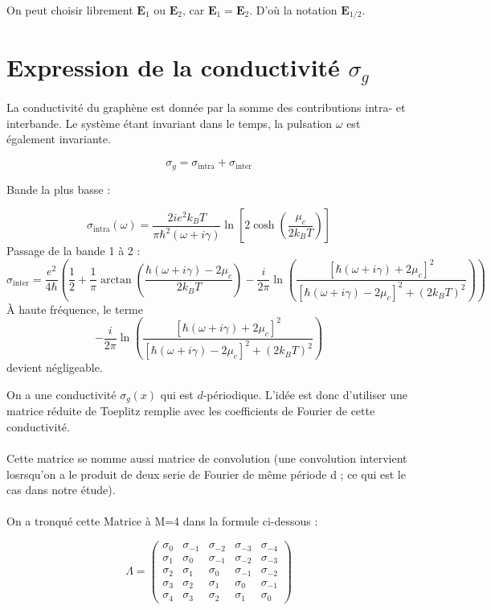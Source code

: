 \documentclass{article}
\begin{document}
On peut choisir librement $\mathbf{E}_1$ ou $\mathbf{E}_2$, car $\mathbf{E}_1 = \mathbf{E}_2$. D'où la notation $\mathbf{E}_{1/2}$.

\section*{Expression de la conductivité \( \sigma_g \)}

La conductivité du graphène est donnée par la somme des contributions intra- et interbande. Le système étant invariant dans le temps, la pulsation \( \omega \) est également invariante.

\[
\sigma_g = \sigma_{\text{intra}} + \sigma_{\text{inter}}
\]

Bande la plus basse :

\[
\sigma_{\text{intra}}(\omega) = \frac{2i e^2 k_B T}{\pi \hbar^2 (\omega + i \gamma)} \ln \left[ 2 \cosh\left(\frac{\mu_c}{2k_B T}\right) \right]
\]
Passage de la bande 1 à 2 :
\[
\sigma_{\text{inter}} = \frac{e^2}{4\hbar} \left( \frac{1}{2} + \frac{1}{\pi} \arctan \left( \frac{\hbar(\omega + i\gamma) - 2\mu_c}{2k_B T} \right)
- \frac{i}{2\pi} \ln \left( \frac{[\hbar(\omega + i\gamma) + 2\mu_c]^2}{[\hbar(\omega + i\gamma) - 2\mu_c]^2 + (2k_B T)^2} \right) \right)
\]
À haute fréquence, le terme
\[
- \frac{i}{2\pi} \ln \left( \frac{[\hbar(\omega + i\gamma) + 2\mu_c]^2}{[\hbar(\omega + i\gamma) - 2\mu_c]^2 + (2k_B T)^2} \right)
\]
devient négligeable.

\bigskip

On a une conductivité \( \sigma_g(x) \) qui est \( d \)-périodique.  
L'idée est donc d'utiliser une matrice réduite de Toeplitz remplie avec les coefficients de Fourier de cette conductivité. 
\\ \\
Cette matrice se nomme aussi matrice de convolution (une convolution intervient losrsqu'on a le produit de deux serie de Fourier de même période d ; ce qui est le cas dans notre étude).
\\ \\
On a tronqué cette Matrice à M=4 dans la formule ci-dessous :

\[
\Lambda = 
\begin{pmatrix}
\sigma_0 & \sigma_{-1} & \sigma_{-2} & \sigma_{-3} & \sigma_{-4} \\
\sigma_1 & \sigma_0     & \sigma_{-1} & \sigma_{-2} & \sigma_{-3} \\
\sigma_2 & \sigma_1     & \sigma_0     & \sigma_{-1} & \sigma_{-2} \\
\sigma_3 & \sigma_2     & \sigma_1     & \sigma_0     & \sigma_{-1} \\
\sigma_4 & \sigma_3     & \sigma_2     & \sigma_1     & \sigma_0
\end{pmatrix}
\]
\end{document}
